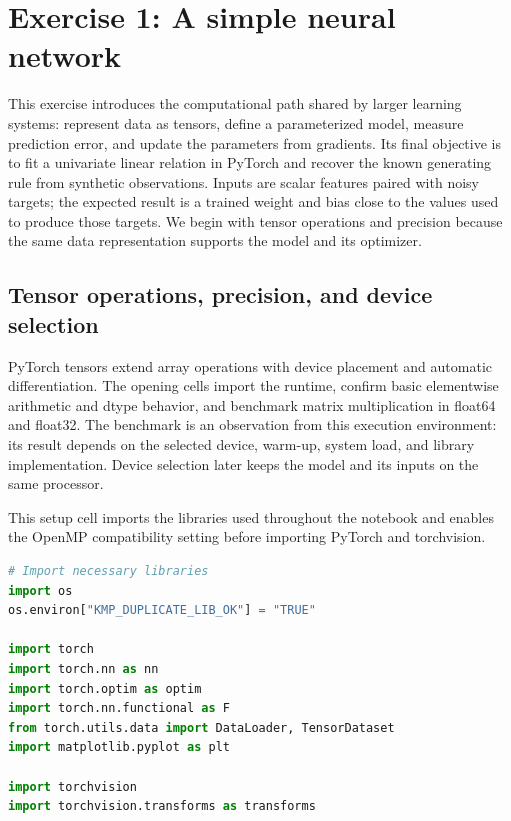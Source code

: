 \documentclass[../labs.tex]{subfiles}
\begin{document}
\chapter{Exercise 1: A simple neural network}
\label{ch:lab01_ex1}

This exercise introduces the computational path shared by larger learning systems: represent data as tensors, define a parameterized model, measure prediction error, and update the parameters from gradients. Its final objective is to fit a univariate linear relation in PyTorch and recover the known generating rule from synthetic observations. Inputs are scalar features paired with noisy targets; the expected result is a trained weight and bias close to the values used to produce those targets. We begin with tensor operations and precision because the same data representation supports the model and its optimizer.

\section{Tensor operations, precision, and device selection}

PyTorch tensors extend array operations with device placement and automatic differentiation. The opening cells import the runtime, confirm basic elementwise arithmetic and dtype behavior, and benchmark matrix multiplication in float64 and float32. The benchmark is an observation from this execution environment: its result depends on the selected device, warm-up, system load, and library implementation. Device selection later keeps the model and its inputs on the same processor.


\noindent This setup cell imports the libraries used throughout the notebook and enables the OpenMP compatibility setting before importing PyTorch and torchvision.\par
\begin{lstlisting}[language=Python,basicstyle=\ttfamily\scriptsize,breaklines=true,breakatwhitespace=false,columns=fullflexible,keepspaces=true,numbers=none]
# Import necessary libraries
import os
os.environ["KMP_DUPLICATE_LIB_OK"] = "TRUE"

import torch
import torch.nn as nn
import torch.optim as optim
import torch.nn.functional as F
from torch.utils.data import DataLoader, TensorDataset
import matplotlib.pyplot as plt

import torchvision
import torchvision.transforms as transforms
\end{lstlisting}
\end{document}
